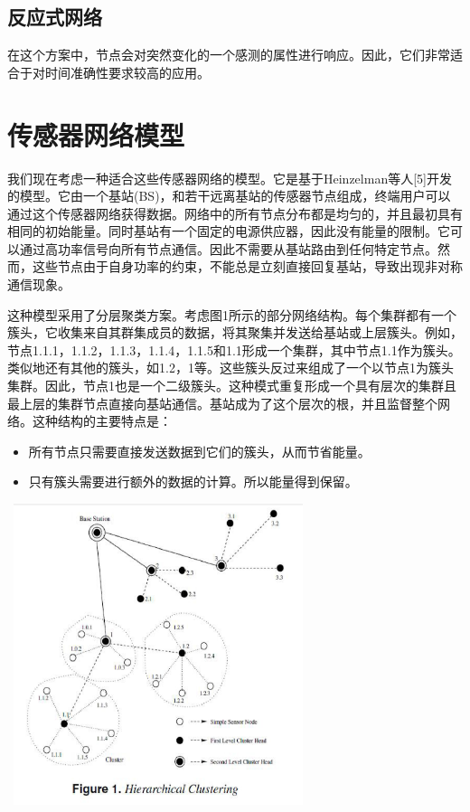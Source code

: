 \documentclass[journal]{IEEEtran}
\begin{document}
\begin{CJK}{UTF8}{gbsn}
\subsection{\textbf{反应式网络}}

在这个方案中，节点会对突然变化的一个感测的属性进行响应。因此，它们非常适合于对时间准确性要求较高的应用。

\section{\textbf{传感器网络模型}}

我们现在考虑一种适合这些传感器网络的模型。它是基于Heinzelman等人[5]开发的模型。它由一个基站(BS)，和若干远离基站的传感器节点组成，终端用户可以通过这个传感器网络获得数据。网络中的所有节点分布都是均匀的，并且最初具有相同的初始能量。同时基站有一个固定的电源供应器，因此没有能量的限制。它可以通过高功率信号向所有节点通信。因此不需要从基站路由到任何特定节点。然而，这些节点由于自身功率的约束，不能总是立刻直接回复基站，导致出现非对称通信现象。

这种模型采用了分层聚类方案。考虑图1所示的部分网络结构。每个集群都有一个簇头，它收集来自其群集成员的数据，将其聚集并发送给基站或上层簇头。例如，节点1.1.1，1.1.2，1.1.3，1.1.4，1.1.5和1.1形成一个集群，其中节点1.1作为簇头。类似地还有其他的簇头，如1.2，1等。这些簇头反过来组成了一个以节点1为簇头集群。因此，节点1也是一个二级簇头。这种模式重复形成一个具有层次的集群且最上层的集群节点直接向基站通信。基站成为了这个层次的根，并且监督整个网络。这种结构的主要特点是：

\begin{itemize}
  \item 所有节点只需要直接发送数据到它们的簇头，从而节省能量。
  \item 只有簇头需要进行额外的数据的计算。所以能量得到保留。 
\end{itemize}
\noindent
\includegraphics[height=250pt, width=250pt]{1.eps}


\end{CJK}
\end{document}
